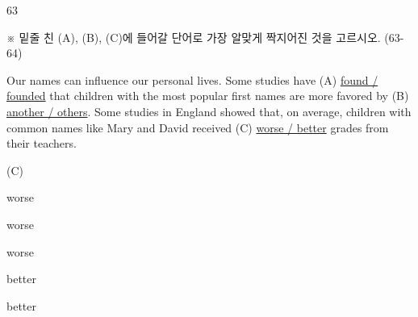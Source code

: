 \begin{question}{63}
\begin{framedtext}
※ 밑줄 친 (A), (B), (C)에 들어갈 단어로 가장 알맞게 짝지어진 것을 고르시오. (63-64) \par
\end{framedtext}
Our names can influence our personal lives. Some studies have (A) \uline{found / founded} that children with the most popular first names are more favored by (B) \uline{another / others}. Some studies in England showed that, on average, children with common names like Mary and David received (C) \uline{worse / better} grades from their teachers.
\begin{choices}
  \item[] \makebox[1.5em]{}\makebox[1.5em]{}(C)
  \item {}worse
  \item {}worse
  \item {}worse
  \item {}better
  \item {}better
\end{choices}
\end{question}
